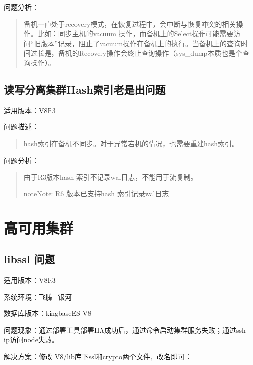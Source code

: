 \documentclass[a4,10pt,oneside,english]{sphinxmanual}
\begin{document}
问题分析：
\begin{quote}

备机一直处于recovery模式，在恢复过程中，会中断与恢复冲突的相关操作。比如：同步主机的vacuum 操作，而备机上的Select操作可能需要访问“旧版本”记录，阻止了vacuum操作在备机上的执行。当备机上的查询时间过长是，备机的Recovery操作会终止查询操作（sys\_dump本质也是个查询操作）。
\end{quote}


\section{读写分离集群Hash索引老是出问题}
\label{\detokenize{high-availability:hash}}
适用版本：V8R3

问题描述：
\begin{quote}

hash索引在备机不同步。对于异常宕机的情况，也需要重建hash索引。
\end{quote}

问题分析：
\begin{quote}

由于R3版本hash 索引不记录wal日志，不能用于流复制。

\begin{sphinxadmonition}{note}{Note:}
R6 版本已支持hash 索引记录wal日志
\end{sphinxadmonition}
\end{quote}


\chapter{高可用集群}
\label{\detokenize{cluster_faq:id1}}\label{\detokenize{cluster_faq::doc}}

\section{libssl 问题}
\label{\detokenize{cluster_faq:libssl}}
适用版本：V8R3

系统环境：飞腾+银河

数据库版本：kingbaseES V8

问题现象：通过部署工具部署HA成功后，通过命令启动集群服务失败；通过ssh ip访问node失败。

解决方案：修改 V8/lib库下ssl和crypto两个文件，改名即可：

\begin{sphinxVerbatim}[commandchars=\\\{\}]
\end{sphinxVerbatim}
\end{document}
